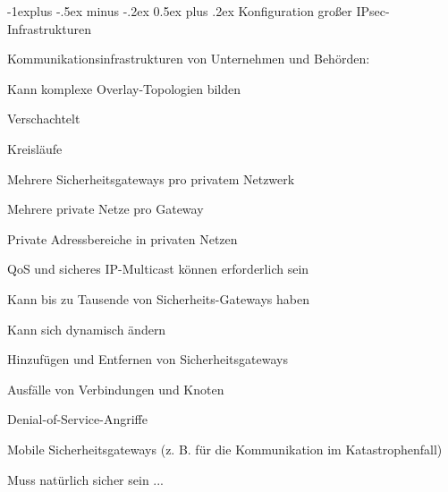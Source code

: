 \documentclass[a4paper]{article}
\makeatletter
\renewcommand{\subsection}{\@startsection{subsection}{2}{0mm}%
 {-1explus -.5ex minus -.2ex}%
 {0.5ex plus .2ex}%
 {\normalfont\normalsize\bfseries}}
\makeatother
\begin{document}
\begin{multicols}{3}
\begin{itemize*}
            \subsection{Konfiguration großer
                  IPsec-Infrastrukturen}
            \begin{itemize*}
                  \item Kommunikationsinfrastrukturen von Unternehmen und Behörden:
                  \item Kann komplexe Overlay-Topologien bilden
                  \begin{itemize*}
                        \item Verschachtelt
                        \item Kreisläufe
                        \item Mehrere Sicherheitsgateways pro privatem Netzwerk
                        \item Mehrere private Netze pro Gateway
                        \item Private Adressbereiche in privaten Netzen
                        \item QoS und sicheres IP-Multicast können erforderlich sein
                  \end{itemize*}
                  \item Kann bis zu Tausende von Sicherheits-Gateways haben
                  \item Kann sich dynamisch ändern
                  \begin{itemize*}
                        \item Hinzufügen und Entfernen von Sicherheitsgateways
                        \item Ausfälle von Verbindungen und Knoten
                        \item Denial-of-Service-Angriffe
                        \item Mobile Sicherheitsgateways (z. B. für die Kommunikation im Katastrophenfall)
                  \end{itemize*}
                  \item Muss natürlich sicher sein ...
            \end{itemize*}


\end{itemize*}
\end{multicols}
\end{document}
